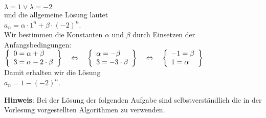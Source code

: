 \documentclass{article}
\begin{document}
\begin{enumerate}
      $\lambda = 1 \vee \lambda = - 2$
      \\[0.2cm]
      und die allgemeine L\"osung lautet
      \\[0.2cm]
      \hspace*{1.3cm} $a_n = \alpha \cdot  1^n + \beta \cdot  (-2)^n$. \\[0.2cm]
      Wir bestimmen die Konstanten $\alpha$ und $\beta$ durch Einsetzen
      der Anfangsbedingungen: 
      \\[0.2cm]
      \hspace*{1.3cm}
       $
      \left\{\begin{array}[c]{lcl}
        0 = \alpha + \beta \\
        3 = \alpha - 2\cdot \beta \\
      \end{array}\right\} \quad \Leftrightarrow\quad
      \left\{\begin{array}[c]{lcl}
        \alpha = -\beta \\
        3 = -3\cdot \beta  \\
      \end{array}\right\} \quad \Leftrightarrow\quad
      \left\{\begin{array}[c]{lcl}
        -1 = \beta  \\
        1 = \alpha \\
      \end{array}\right\} 
      $
      \\[0.2cm]
      Damit erhalten wir die L\"osung 
      \\[0.2cm]
      \hspace*{1.3cm} $a_n = 1 - (-2)^n$.
\end{enumerate}


\textbf{Hinweis}: Bei der L\"osung der folgenden Aufgabe sind selbstverst\"andlich
die in der Vorlesung vorgestellten Algorithmen zu verwenden.
\vspace{0.3cm}
\end{document}
